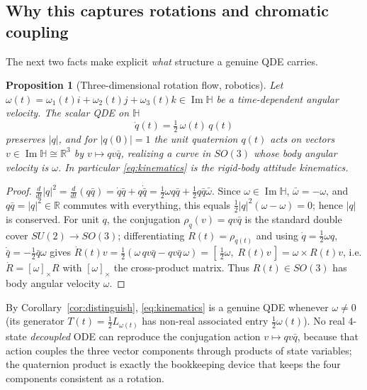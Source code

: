 \documentclass{amsart}
\newtheorem{proposition}[theorem]{Proposition}
\theoremstyle{definition}
\newcommand{\HH}{\mathbb{H}}
\newcommand{\RR}{\mathbb{R}}
\newcommand{\Imag}{\operatorname{Im}}
\begin{document}
\subsection{Why this captures rotations and chromatic coupling}
The next two facts make explicit \emph{what} structure a genuine QDE
carries.

\begin{proposition}[Three-dimensional rotation flow, robotics]
\label{prop:rotation}
Let $\omega(t)=\omega_1(t)i+\omega_2(t)j+\omega_3(t)k\in\Imag\HH$ be a
time-dependent angular velocity. The scalar QDE on $\HH$
\begin{equation}\label{eq:kinematics}
\dot q(t)=\tfrac12\,\omega(t)\,q(t)
\end{equation}
preserves $|q|$, and for $|q(0)|=1$ the unit quaternion $q(t)$ acts on
vectors $v\in\Imag\HH\cong\RR^3$ by $v\mapsto q v\bar q$, realizing a
curve in $SO(3)$ whose body angular velocity is $\omega$. In particular
\eqref{eq:kinematics} is the rigid-body attitude kinematics.
\end{proposition}

\begin{proof}
$\frac{d}{dt}|q|^2=\frac{d}{dt}(q\bar q)=\dot q\bar q+q\dot{\bar q}
=\tfrac12\omega q\bar q+\tfrac12 q\bar q\bar\omega$. Since
$\omega\in\Imag\HH$, $\bar\omega=-\omega$, and $q\bar q=|q|^2\in\RR$
commutes with everything, this equals
$\tfrac12|q|^2(\omega-\omega)=0$; hence $|q|$ is conserved. For unit
$q$, the conjugation $\rho_q(v)=qv\bar q$ is the standard double cover
$SU(2)\to SO(3)$; differentiating $R(t)=\rho_{q(t)}$ and using
$\dot q=\tfrac12\omega q$, $\dot{\bar q}=-\tfrac12\bar q\omega$ gives
$\dot R(t)v=\tfrac12(\omega\,qv\bar q-qv\bar q\,\omega)
=[\,\tfrac12\omega,\;R(t)v\,]=\omega\times R(t)v$, i.e.
$\dot R=[\omega]_\times R$ with $[\omega]_\times$ the cross-product
matrix. Thus $R(t)\in SO(3)$ has body angular velocity $\omega$.
\end{proof}

By Corollary~\ref{cor:distinguish}, \eqref{eq:kinematics} is a genuine
QDE whenever $\omega\ne0$ (its generator $T(t)=\tfrac12 L_{\omega(t)}$
has non-real associated entry $\tfrac12\omega(t)$). No real $4$-state
\emph{decoupled} ODE can reproduce the conjugation action $v\mapsto
qv\bar q$, because that action couples the three vector components
through products of state variables; the quaternion product is exactly
the bookkeeping device that keeps the four components consistent as a
rotation.
\end{document}
